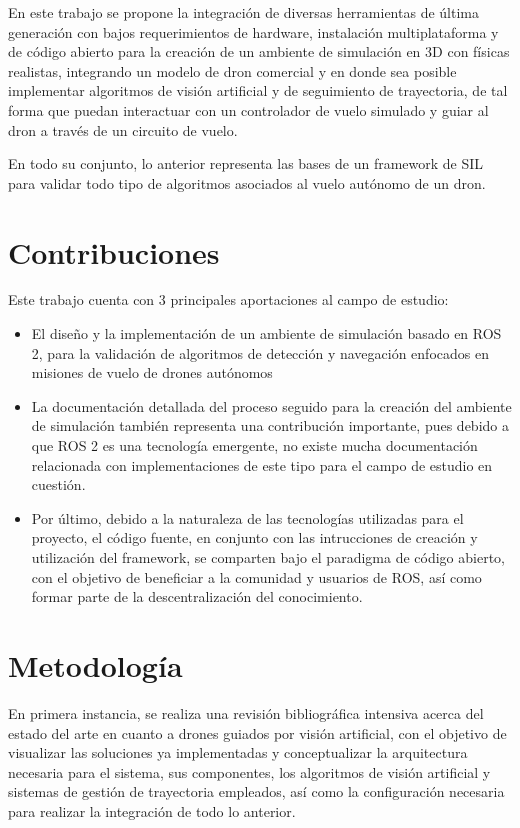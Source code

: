 En este trabajo se propone la integración de diversas herramientas de última generación con bajos requerimientos de hardware, instalación multiplataforma y de código abierto para la creación de un ambiente de simulación en 3D con físicas realistas, integrando un modelo de dron comercial y en donde sea posible implementar algoritmos de visión artificial y de seguimiento de trayectoria, de tal forma que puedan interactuar con un controlador de vuelo simulado y guiar al dron a través de un circuito de vuelo.    

En todo su conjunto, lo anterior representa las bases de un framework de SIL para validar todo tipo de algoritmos asociados al vuelo autónomo de un dron.

\section{Contribuciones}

Este trabajo cuenta con 3 principales aportaciones al campo de estudio:

\begin{itemize}
    \item El diseño y la implementación de un ambiente de simulación basado en ROS 2, para la validación de algoritmos de detección y navegación enfocados en misiones de vuelo de drones autónomos
    \item La documentación detallada del proceso seguido para la creación del ambiente de simulación también representa una contribución importante, pues debido a que ROS 2 es una tecnología emergente, no existe mucha documentación relacionada con implementaciones de este tipo para el campo de estudio en cuestión.
    \item Por último, debido a la naturaleza de las tecnologías utilizadas para el proyecto, el código fuente, en conjunto con las intrucciones de creación y utilización del framework, se comparten bajo el paradigma de código abierto, con el objetivo de beneficiar a la comunidad y usuarios de ROS, así como formar parte de la descentralización del conocimiento.
\end{itemize}


\section{Metodología}

En primera instancia, se realiza una revisión bibliográfica intensiva acerca del estado del arte en cuanto a drones guiados por visión artificial, con el objetivo de visualizar las soluciones ya implementadas y conceptualizar la arquitectura necesaria para el sistema, sus componentes, los algoritmos de visión artificial y sistemas de gestión de trayectoria empleados, así como la configuración necesaria para realizar la integración de todo lo anterior.


